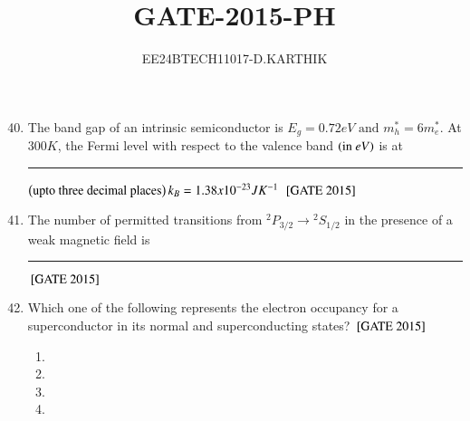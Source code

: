 \documentclass[journal]{IEEEtran}
\begin{document}

\vspace{3cm}

\title{GATE-2015-PH}
\author{EE24BTECH11017-D.KARTHIK}
\maketitle

\renewcommand{\thefigure}{\theenumi}
\renewcommand{\thetable}{\theenumi}
\setlength{\intextsep}{10pt}


\renewcommand{\thetable}{\theenumi}

\begin{enumerate}
    \setcounter{enumi}{39}

\item The band gap of an intrinsic semiconductor is $E_g = 0.72 eV \text{ and } m^*_h = 6m^*_e. $ At $300K$, the Fermi level with respect to the valence band $\left(\text{in } eV\right)$ is at \rule{1.7cm}{0.2mm} $\left(\text{upto three decimal places}\right) k_B = 1.38 x 10^{-23}JK^{-1}$ \hfill{${}\left[\text{GATE 2015}\right]$} 
\item The number of permitted transitions from ${{}^{2}P_{3/2} \rightarrow {}^{2}S_{1/2}}
$ in the presence of a weak magnetic field is \rule{3cm}{0.2mm} \hfill{${}\left[\text{GATE 2015}\right]$} 
\item Which one of the following represents the electron occupancy for a superconductor in its normal and superconducting states? \hfill{${}\left[\text{GATE 2015}\right]$} 

\begin{multicols}{2}
\begin{enumerate}

    \item 
    \item 
    \item 
    
    \item 
\end{enumerate}
\end{multicols}







\end{enumerate}
\end{document}
